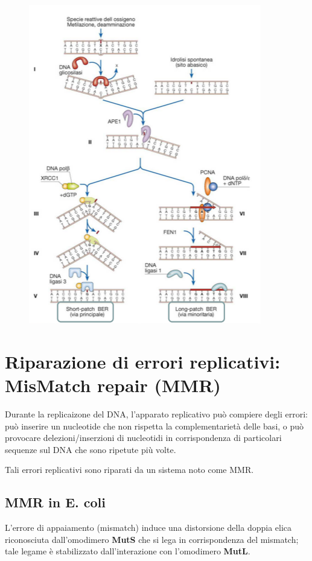 \documentclass[11pt]{book}
\begin{document}
\begin{figure}[htp]
\centering
\includegraphics[scale=0.6]{img/25_BER.png}
\caption{}
\label{ber}
\end{figure}

\section{Riparazione di errori replicativi: MisMatch repair
(MMR)}\label{riparazione-di-errori-replicativi-mismatch-repair-mmr}

Durante la replicaizone del DNA, l'apparato replicativo può compiere
degli errori: può inserire un nucleotide che non rispetta la
complementarietà delle basi, o può provocare delezioni/inserzioni di
nucleotidi in corrispondenza di particolari sequenze sul DNA che sono
ripetute più volte.

Tali errori replicativi sono riparati da un sistema noto come MMR.

\subsection{MMR in E. coli}\label{mmr-in-e.-coli}

L'errore di appaiamento (mismatch) induce una distorsione della doppia
elica riconosciuta dall'omodimero \textbf{MutS} che si lega in
corrispondenza del mismatch; tale legame è stabilizzato dall'interazione
con l'omodimero \textbf{MutL}.
\end{document}
